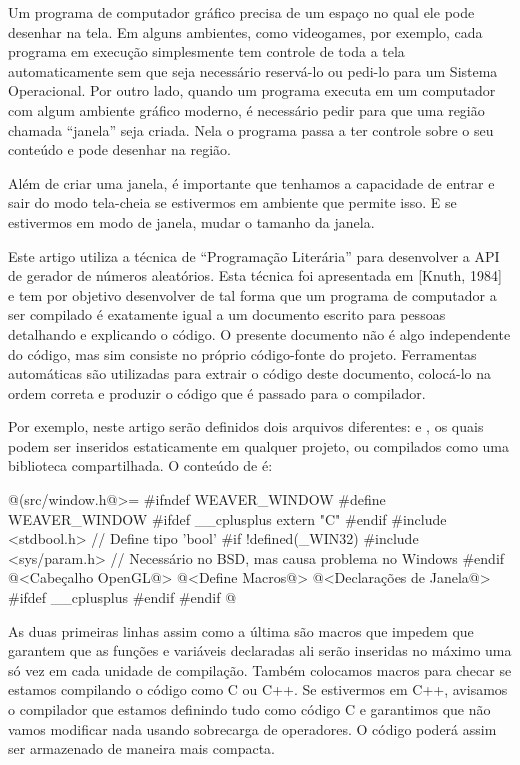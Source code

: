 Um programa de computador gráfico precisa de um espaço no qual ele
pode desenhar na tela. Em alguns ambientes, como videogames, por
exemplo, cada programa em execução simplesmente tem controle de toda a
tela automaticamente sem que seja necessário reservá-lo ou pedi-lo
para um Sistema Operacional. Por outro lado, quando um programa
executa em um computador com algum ambiente gráfico moderno, é
necessário pedir para que uma região chamada ``janela'' seja
criada. Nela o programa passa a ter controle sobre o seu conteúdo e
pode desenhar na região.

Além de criar uma janela, é importante que tenhamos a capacidade de
entrar e sair do modo tela-cheia se estivermos em ambiente que permite
isso. E se estivermos em modo de janela, mudar o tamanho da
janela.


Este artigo utiliza a técnica de ``Programação Literária'' para
desenvolver a API de gerador de números aleatórios. Esta técnica foi
apresentada em [Knuth, 1984] e tem por objetivo desenvolver
 de tal forma que um programa de computador a ser compilado
é exatamente igual a um documento escrito para pessoas detalhando e
explicando o código. O presente documento não é algo independente do
código, mas sim consiste no próprio código-fonte do projeto.
Ferramentas automáticas são utilizadas para extrair o código deste
documento, colocá-lo na ordem correta e produzir o código que é
passado para o compilador.

Por exemplo, neste artigo serão definidos dois arquivos
diferentes:  e , os quais
podem ser inseridos estaticamente em qualquer projeto, ou compilados
como uma biblioteca compartilhada. O conteúdo de 
é:

\iniciocodigo
@(src/window.h@>=
#ifndef WEAVER_WINDOW
#define WEAVER_WINDOW
#ifdef __cplusplus
extern "C" {
#endif
#include <stdbool.h> // Define tipo 'bool'
#if !defined(_WIN32)
#include <sys/param.h> // Necessário no BSD, mas causa problema no Windows
#endif
@<Cabeçalho OpenGL@>
@<Define Macros@>
@<Declarações de Janela@>
#ifdef __cplusplus
}
#endif
#endif
@
\fimcodigo

As duas primeiras linhas assim como a última são macros que impedem
que garantem que as funções e variáveis declaradas ali serão inseridas
no máximo uma só vez em cada unidade de compilação. Também colocamos
macros para checar se estamos compilando o código como C ou C++. Se
estivermos em C++, avisamos o compilador que estamos definindo tudo
como código C e garantimos que não vamos modificar nada usando
sobrecarga de operadores. O código poderá assim ser armazenado de
maneira mais compacta.

